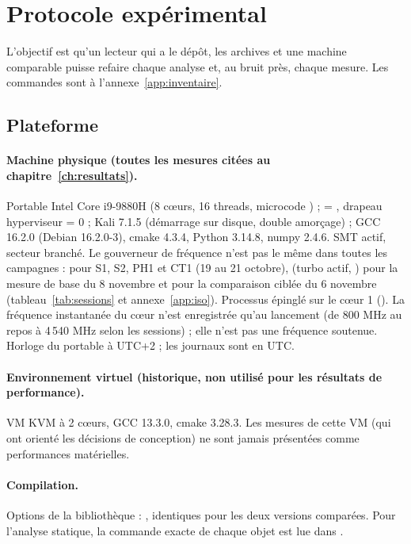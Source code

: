 \section{Protocole expérimental}\label{sec:protocole}
L'objectif est qu'un lecteur qui a le dépôt, les archives et une machine comparable puisse refaire chaque analyse et, au bruit près, chaque mesure. Les commandes sont à l'annexe~\ref{app:inventaire}.

\subsection{Plateforme}
\paragraph{Machine physique (toutes les mesures citées au chapitre~\ref{ch:resultats}).} Portable Intel Core i9-9880H (8 cœurs, 16 threads, microcode ) ;  = , drapeau hyperviseur = 0 ; Kali 7.1.5 (démarrage sur disque, double amorçage) ; GCC 16.2.0 (Debian 16.2.0-3), cmake 4.3.4, Python 3.14.8, numpy 2.4.6. SMT actif, secteur branché. Le gouverneur de fréquence n'est pas le même dans toutes les campagnes :  pour S1, S2, PH1 et CT1 (19 au 21 octobre),  (turbo actif, ) pour la mesure de base du 8 novembre et pour la comparaison ciblée du 6 novembre (tableau~\ref{tab:sessions} et annexe~\ref{app:iso}). Processus épinglé sur le cœur 1 (). La fréquence instantanée du cœur n'est enregistrée qu'au lancement (de 800 MHz au repos à 4\,540 MHz selon les sessions) ; elle n'est pas une fréquence soutenue. Horloge du portable à UTC+2 ; les journaux  sont en UTC.

\paragraph{Environnement virtuel (historique, non utilisé pour les résultats de performance).} VM KVM à 2 cœurs, GCC 13.3.0, cmake 3.28.3. Les mesures de cette VM (qui ont orienté les décisions de conception) ne sont jamais présentées comme performances matérielles.

\paragraph{Compilation.} Options de la bibliothèque : , identiques pour les deux versions comparées. Pour l'analyse statique, la commande exacte de chaque objet est lue dans .

